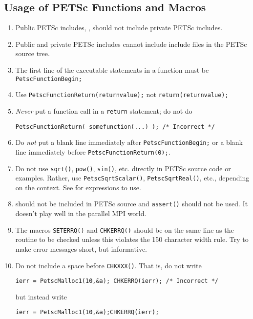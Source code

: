 \subsection{Usage of PETSc Functions and Macros}
\label{sec:stylepetsc}
\begin{enumerate}
\item Public PETSc includes, , should not include private PETSc  includes.
\item Public and private PETSc includes cannot include include files in the PETSc source tree.
\item The first line of the executable statements in a function must be \lstinline{PetscFunctionBegin;}
\item Use \lstinline{PetscFunctionReturn(returnvalue);} not \lstinline{return(returnvalue);}
\item {\em Never} put a function call in a \lstinline{return} statement; do not do
\begin{lstlisting}
PetscFunctionReturn( somefunction(...) ); /* Incorrect */
\end{lstlisting}
\item Do {\em not} put a blank line immediately after \lstinline{PetscFunctionBegin;} or
  a blank line immediately before \lstinline{PetscFunctionReturn(0);}.
\item Do not use \lstinline{sqrt()}, \lstinline{pow()}, \lstinline{sin()}, etc. directly in PETSc source code or examples. 
  Rather, use \lstinline{PetscSqrtScalar()}, \lstinline{PetscSqrtReal()}, etc., depending on the context. 
  See  for expressions to use.
\item {} should not be included in PETSc source and \lstinline{assert()} should not be used. It doesn't play well in the parallel MPI world.
\item The macros \lstinline{SETERRQ()} and \lstinline{CHKERRQ()} should be on the 
  same line as the routine to be checked unless this violates the
  150 character width rule. Try to make error messages short, but
  informative.
\item Do not include a space before \lstinline{CHKXXX()}. 
  That is, do not write
\begin{lstlisting}
ierr = PetscMalloc1(10,&a); CHKERRQ(ierr); /* Incorrect */
\end{lstlisting}
but instead write
\begin{lstlisting}
ierr = PetscMalloc1(10,&a);CHKERRQ(ierr);
\end{lstlisting}

\end{enumerate}
